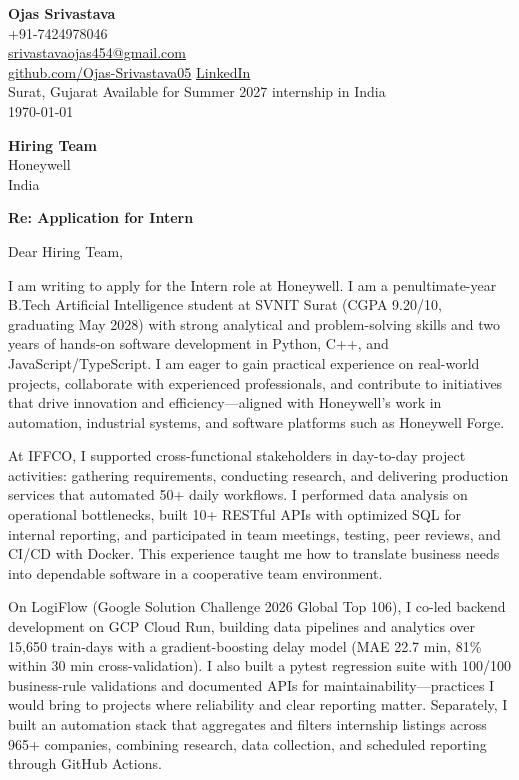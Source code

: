 \documentclass[a4paper,11pt]{article}
\begin{document}
\begin{flushright}
\textbf{Ojas Srivastava} \\
+91-7424978046 \\
\href{mailto:srivastavaojas454@gmail.com}{srivastavaojas454@gmail.com} \\
\href{https://github.com/Ojas-Srivastava05}{github.com/Ojas-Srivastava05} \textbar{}
\href{https://linkedin.com/in/ojas-srivastava05}{LinkedIn} \\
Surat, Gujarat \textbar{} Available for Summer 2027 internship in India \\
\today
\end{flushright}

\vspace{4mm}
\textbf{Hiring Team} \\
Honeywell \\
India

\vspace{2mm}
\textbf{Re: Application for Intern}

Dear Hiring Team,

I am writing to apply for the Intern role at Honeywell. I am a penultimate-year B.Tech Artificial Intelligence student at SVNIT Surat (CGPA 9.20/10, graduating May 2028) with strong analytical and problem-solving skills and two years of hands-on software development in Python, C++, and JavaScript/TypeScript. I am eager to gain practical experience on real-world projects, collaborate with experienced professionals, and contribute to initiatives that drive innovation and efficiency---aligned with Honeywell's work in automation, industrial systems, and software platforms such as Honeywell Forge.

At IFFCO, I supported cross-functional stakeholders in day-to-day project activities: gathering requirements, conducting research, and delivering production services that automated 50+ daily workflows. I performed data analysis on operational bottlenecks, built 10+ RESTful APIs with optimized SQL for internal reporting, and participated in team meetings, testing, peer reviews, and CI/CD with Docker. This experience taught me how to translate business needs into dependable software in a cooperative team environment.

On LogiFlow (Google Solution Challenge 2026 Global Top 106), I co-led backend development on GCP Cloud Run, building data pipelines and analytics over 15,650 train-days with a gradient-boosting delay model (MAE 22.7 min, 81\% within 30 min cross-validation). I also built a pytest regression suite with 100/100 business-rule validations and documented APIs for maintainability---practices I would bring to projects where reliability and clear reporting matter. Separately, I built an automation stack that aggregates and filters internship listings across 965+ companies, combining research, data collection, and scheduled reporting through GitHub Actions.
\end{document}
